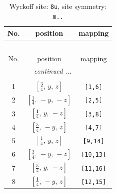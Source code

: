 \documentclass[fleqn,8pt]{jsarticle}
\begin{document}
\renewcommand{\arraystretch}{1.2}
\begin{longtable}{ccc}
\caption{Wyckoff site: {\tt 8u}, site symmetry: {\tt m..}}
 \\
 \hline \hline
No. & position & mapping \\ \hline \endfirsthead

\multicolumn{2}{l}{\tablename\ \thetable{}} \\
 \hline \hline
No. & position & mapping \\ \hline \endhead

 \hline \hline
\multicolumn{2}{r}{\footnotesize\it continued ...} \\ \endfoot

 \hline \hline
\multicolumn{2}{r}{} \\ \endlastfoot

1 & $\left[ \frac{3}{4},\, y,\, z \right]$ & {\tt [1,6]} \\ \hline
2 & $\left[ \frac{1}{4},\, - y,\, - z \right]$ & {\tt [2,5]} \\ \hline
3 & $\left[ \frac{1}{4},\, y,\, - z \right]$ & {\tt [3,8]} \\ \hline
4 & $\left[ \frac{3}{4},\, - y,\, z \right]$ & {\tt [4,7]} \\ \hline
5 & $\left[ \frac{1}{4},\, y,\, z \right]$ & {\tt [9,14]} \\ \hline
6 & $\left[ \frac{3}{4},\, - y,\, - z \right]$ & {\tt [10,13]} \\ \hline
7 & $\left[ \frac{3}{4},\, y,\, - z \right]$ & {\tt [11,16]} \\ \hline
8 & $\left[ \frac{1}{4},\, - y,\, z \right]$ & {\tt [12,15]} \\
\end{longtable}
\renewcommand{\arraystretch}{1.2}
\end{document}
